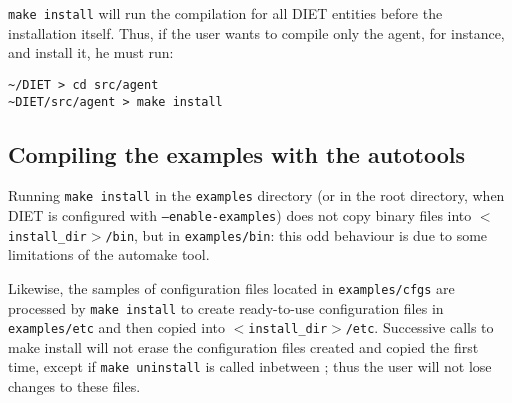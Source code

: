 \texttt{make install} will run the compilation for all DIET entities
before the installation itself. Thus, if the user wants to compile
only the agent, for instance, and install it, he must run:
{\footnotesize
\begin{verbatim}
~/DIET > cd src/agent
~DIET/src/agent > make install
\end{verbatim}
}

\subsection{Compiling the examples with the autotools}

Running \texttt{make install} in the \texttt{examples} directory (or
in the root directory, when DIET is configured with
\texttt{--enable-examples}) does not copy binary files into
\texttt{$<$install\_dir$>$/bin}, but in \texttt{examples/bin}: this
odd behaviour is due to some limitations of the \textsf{automake} tool.

Likewise, the samples of configuration files located in
\texttt{examples/cfgs} are processed by \texttt{make install} to
create ready-to-use configuration files in \texttt{examples/etc} and
then copied into \texttt{$<$install\_dir$>$/etc}. Successive calls to
make install will not erase the configuration files created and copied
the first time, except if \texttt{make uninstall} is called inbetween
; thus the user will not lose changes to these files.

